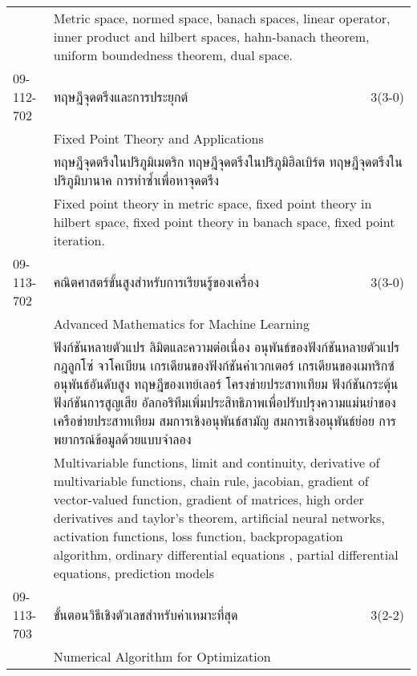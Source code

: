 \begin{longtable}{p{}p{}r{}}
&  \multicolumn{2}{p{0.75\textwidth}}{Metric space, normed space, banach spaces, linear operator, inner product and hilbert spaces, hahn-banach theorem, uniform boundedness theorem, dual space.} \vspace{8mm} \\*
09-112-702 & ทฤษฎีจุดตรึงและการประยุกต์ & 3(3-0)\\*
 & Fixed Point Theory and Applications & \phantom{x} \vspace{3mm} \\*
&  \multicolumn{2}{p{0.75\textwidth}}{ทฤษฎีจุดตรึงในปริภูมิเมตริก ทฤษฎีจุดตรึงในปริภูมิฮิลเบิร์ต ทฤษฎีจุดตรึงในปริภูมิบานาค การทำซ้ำเพื่อหาจุดตรึง} \vspace{3mm} \\*
&  \multicolumn{2}{p{0.75\textwidth}}{Fixed point theory in metric space, fixed point theory in hilbert space, fixed point theory in banach space, fixed point iteration.} \vspace{8mm} \\*
09-113-702 & คณิตศาสตร์ขั้นสูงสำหรับการเรียนรู้ของเครื่อง & 3(3-0)\\*
 & Advanced Mathematics for Machine Learning & \phantom{x} \vspace{3mm} \\*
&  \multicolumn{2}{p{0.75\textwidth}}{ฟังก์ชันหลายตัวแปร ลิมิตและความต่อเนื่อง อนุพันธ์ของฟังก์ชันหลายตัวแปร กฎลูกโซ่ จาโคเบียน เกรเดียนของฟังก์ชันค่าเวกเตอร์ เกรเดียนของเมทริกซ์ อนุพันธ์อันดับสูง ทฤษฎีของเทย์เลอร์ โครงข่ายประสาทเทียม ฟังก์ชันกระตุ้น ฟังก์ชันการสูญเสีย อัลกอริทึมเพิ่มประสิทธิภาพเพื่อปรับปรุงความแม่นยำของเครือข่ายประสาทเทียม สมการเชิงอนุพันธ์สามัญ สมการเชิงอนุพันธ์ย่อย การพยากรณ์ข้อมูลด้วยแบบจำลอง} \vspace{3mm} \\*
&  \multicolumn{2}{p{0.75\textwidth}}{Multivariable functions, limit and continuity, derivative of multivariable functions, chain rule, jacobian, gradient of vector-valued function, gradient of matrices, high order derivatives and taylor’s theorem, artificial neural networks, activation functions, loss function, backpropagation algorithm, ordinary differential equations , partial differential equations, prediction models} \vspace{8mm} \\*
09-113-703 & ขั้นตอนวิธีเชิงตัวเลขสำหรับค่าเหมาะที่สุด  & 3(2-2)\\*
 & Numerical Algorithm for Optimization & \phantom{x} \vspace{3mm} \\*

\end{longtable}
